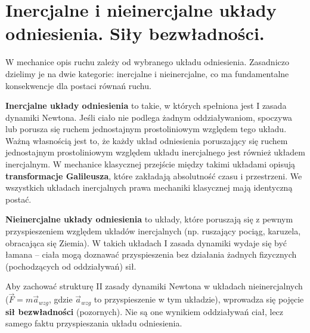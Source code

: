 \documentclass[11pt, a4paper]{article}
\begin{document}
\section{Inercjalne i nieinercjalne układy odniesienia. Siły bezwładności.}

W mechanice opis ruchu zależy od wybranego układu odniesienia. Zasadniczo dzielimy je na dwie kategorie: inercjalne i nieinercjalne, co ma fundamentalne konsekwencje dla postaci równań ruchu.

\textbf{Inercjalne układy odniesienia} to takie, w których spełniona jest I zasada dynamiki Newtona. Jeśli ciało nie podlega żadnym oddziaływaniom, spoczywa lub porusza się ruchem jednostajnym prostoliniowym względem tego układu. Ważną własnością jest to, że każdy układ odniesienia poruszający się ruchem jednostajnym prostoliniowym względem układu inercjalnego jest również układem inercjalnym. W mechanice klasycznej przejście między takimi układami opisują \textbf{transformacje Galileusza}, które zakładają absolutność czasu i przestrzeni. We wszystkich układach inercjalnych prawa mechaniki klasycznej mają identyczną postać.

\textbf{Nieinercjalne układy odniesienia} to układy, które poruszają się z pewnym przyspieszeniem względem układów inercjalnych (np. ruszający pociąg, karuzela, obracająca się Ziemia). W takich układach I zasada dynamiki wydaje się być łamana – ciała mogą doznawać przyspieszenia bez działania żadnych fizycznych (pochodzących od oddziaływań) sił.

Aby zachować strukturę II zasady dynamiki Newtona w układach nieinercjalnych ($\vec{F} = m\vec{a}_{wzg}$, gdzie $\vec{a}_{wzg}$ to przyspieszenie w tym układzie), wprowadza się pojęcie \textbf{sił bezwładności} (pozornych). Nie są one wynikiem oddziaływań ciał, lecz samego faktu przyspieszania układu odniesienia.
\end{document}
